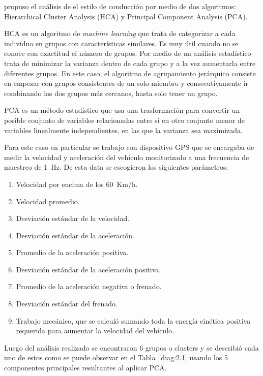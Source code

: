 \citeauthor{constantinescu} \cite{constantinescu} propuso el análisis de el estilo de conducción por medio de dos algoritmos: Hierarchical Cluster Analysis (HCA) y Principal Component Analysis (PCA).

HCA es un algoritmo de {\it machine learning} que trata de categorizar a cada individuo en grupos con características similares. Es muy útil cuando no se conoce con exactitud el número de grupos. Por medio de un análisis estadístico trata de minimizar la varianza dentro de cada grupo y a la vez aumentarla entre diferentes grupos. En este caso, el algoritmo de agrupamiento jerárquico consiste en empezar con grupos consistentes de un solo miembro y consecutivamente ir combinando los dos grupos más cercanos, hasta solo tener un grupo.

PCA es un método estadístico que usa una trasformación para convertir un posible conjunto de variables relacionadas entre si en otro conjunto menor de variables linealmente independientes, en las que la varianza sea maximizada.

Para este caso en particular se trabajo con dispositivo GPS que se encargaba de medir la velocidad y aceleración del vehículo monitorizado a una frecuencia de muestreo de \SI[mode=text]{1}{Hz}. De esta data se escogieron los siguientes parámetros:
\begin{enumerate}
    \itemsep0em
    \item Velocidad por encima de los \SI[mode=text]{60}{Km/h}.
    \item Velocidad promedio.
    \item Desviación estándar de la velocidad.
    \item Desviación estándar de la aceleración.
    \item Promedio de la aceleración positiva.
    \item Desviación estándar de la aceleración positiva.
    \item Promedio de la aceleración negativa o frenado.
    \item Desviación estándar del frenado.
    \item Trabajo mecánico, que se calculó sumando toda la energía cinética positiva requerida para aumentar la velocidad del vehículo.
\end{enumerate}

Luego del análisis realizado se encontraron 6 grupos o clusters y se describió cada uno de estos como se puede observar en el Tabla~\ref{diag:2.1} usando los 5 componentes principales resultantes al aplicar PCA.

